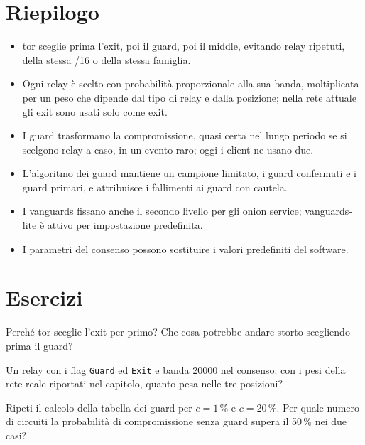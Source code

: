 \section*{Riepilogo}
\begin{itemize}
  \item tor sceglie prima l'exit, poi il guard, poi il middle, evitando relay ripetuti, della stessa /16 o della stessa famiglia.
  \item Ogni relay è scelto con probabilità proporzionale alla sua banda, moltiplicata per un peso che dipende dal tipo di relay e dalla posizione; nella rete attuale gli exit sono usati solo come exit.
  \item I guard trasformano la compromissione, quasi certa nel lungo periodo se si scelgono relay a caso, in un evento raro; oggi i client ne usano due.
  \item L'algoritmo dei guard mantiene un campione limitato, i guard confermati e i guard primari, e attribuisce i fallimenti ai guard con cautela.
  \item I vanguards fissano anche il secondo livello per gli onion service; vanguards-lite è attivo per impostazione predefinita.
  \item I parametri del consenso possono sostituire i valori predefiniti del software.
\end{itemize}

\section*{Esercizi}

\begin{esercizio}[1]\label{es:13-ordine}
Perché tor sceglie l'exit per primo? Che cosa potrebbe andare storto scegliendo prima il guard?
\end{esercizio}

\begin{esercizio}[1]\label{es:13-peso}
Un relay con i flag \texttt{Guard} ed \texttt{Exit} e banda 20000 nel consenso: con i pesi della rete reale riportati nel capitolo, quanto pesa nelle tre posizioni?
\end{esercizio}

\begin{esercizio}[2]\label{es:13-guard}
Ripeti il calcolo della tabella dei guard per $c = 1\,\%$ e $c = 20\,\%$. Per quale numero di circuiti la probabilità di compromissione senza guard supera il 50\,\% nei due casi?
\end{esercizio}


